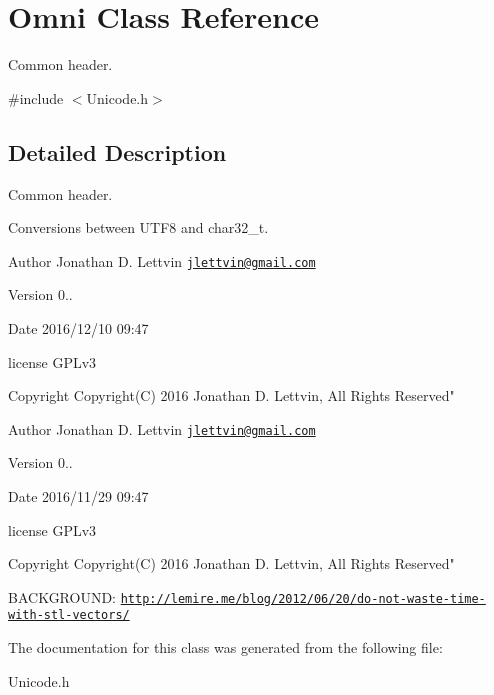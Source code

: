 \hypertarget{class_omni}{}\section{Omni Class Reference}
\label{class_omni}


Common header.  




{\ttfamily \#include $<$Unicode.\+h$>$}



\subsection{Detailed Description}
Common header. 

Conversions between U\+T\+F8 and char32\+\_\+t.

\begin{DoxyAuthor}{Author}
Jonathan D. Lettvin \href{mailto:jlettvin@gmail.com}{\tt jlettvin@gmail.\+com}
\end{DoxyAuthor}
\begin{DoxyVersion}{Version}
0..
\end{DoxyVersion}
\begin{DoxyDate}{Date}
2016/12/10 09\+:47
\end{DoxyDate}
license G\+P\+Lv3

\begin{DoxyCopyright}{Copyright}
Copyright(\+C) 2016 Jonathan D. Lettvin, All Rights Reserved"
\end{DoxyCopyright}
\begin{DoxyAuthor}{Author}
Jonathan D. Lettvin \href{mailto:jlettvin@gmail.com}{\tt jlettvin@gmail.\+com}
\end{DoxyAuthor}
\begin{DoxyVersion}{Version}
0..
\end{DoxyVersion}
\begin{DoxyDate}{Date}
2016/11/29 09\+:47
\end{DoxyDate}
license G\+P\+Lv3

\begin{DoxyCopyright}{Copyright}
Copyright(\+C) 2016 Jonathan D. Lettvin, All Rights Reserved"
\end{DoxyCopyright}
B\+A\+C\+K\+G\+R\+O\+U\+N\+D\+: \href{http://lemire.me/blog/2012/06/20/do-not-waste-time-with-stl-vectors/}{\tt http\+://lemire.\+me/blog/2012/06/20/do-\/not-\/waste-\/time-\/with-\/stl-\/vectors/} 

The documentation for this class was generated from the following file\+:\begin{DoxyCompactItemize}
\item 
Unicode.\+h\end{DoxyCompactItemize}
